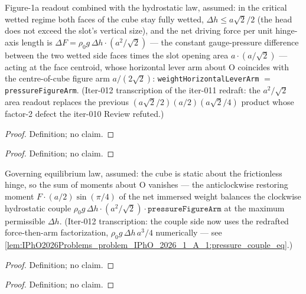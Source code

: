 \begin{definition}
\label{def:IPhO2026Problems_problem_IPhO_2026_1_A_1:PressureMomentReadout}
Figure-1a readout combined with the hydrostatic law, assumed: in the
critical wetted regime both faces of the cube stay fully wetted,
$\Delta h \le a\sqrt{2}/2$ (the head does not exceed the slot's vertical
size), and the net driving force per unit hinge-axis length is
$\Delta F = \rho_0 g\, \Delta h \cdot (a^2/\sqrt{2})$ --- the constant
gauge-pressure difference between the two wetted side faces times the
slot opening area $a \cdot (a/\sqrt{2})$ --- acting at the face centroid,
whose horizontal lever arm about O coincides with the centre-of-cube
figure arm $a/(2\sqrt{2})$:
\texttt{weightHorizontalLeverArm} $=$ \texttt{pressureFigureArm}.
(Iter-012 transcription of the iter-011 redraft: the $a^2/\sqrt{2}$ area
readout replaces the previous
$(a\sqrt{2}/2)(a/2)(a\sqrt{2}/4)$ product whose factor-2 defect the
iter-010 Review refuted.)
\end{definition}
\begin{proof}
Definition; no claim.
\end{proof}
\begin{proof}
Definition; no claim.
\end{proof}

\begin{definition}
\label{def:IPhO2026Problems_problem_IPhO_2026_1_A_1:IsCriticalTorqueBalance}
Governing equilibrium law, assumed: the cube is static about the
frictionless hinge, so the sum of moments about O vanishes --- the
anticlockwise restoring moment $F \cdot (a/2)\sin(\pi/4)$ of the net
immersed weight balances the clockwise hydrostatic couple
$\rho_0 g\, \Delta h \cdot (a^2/\sqrt{2}) \cdot \texttt{pressureFigureArm}$
at the maximum permissible $\Delta h$.  (Iter-012 transcription: the
couple side now uses the redrafted force-then-arm factorization,
$\rho_0 g\, \Delta h\, a^3/4$ numerically --- see
\cref{lem:IPhO2026Problems_problem_IPhO_2026_1_A_1:pressure_couple_eq}.)
\end{definition}
\begin{proof}
Definition; no claim.
\end{proof}
\begin{proof}
Definition; no claim.
\end{proof}


